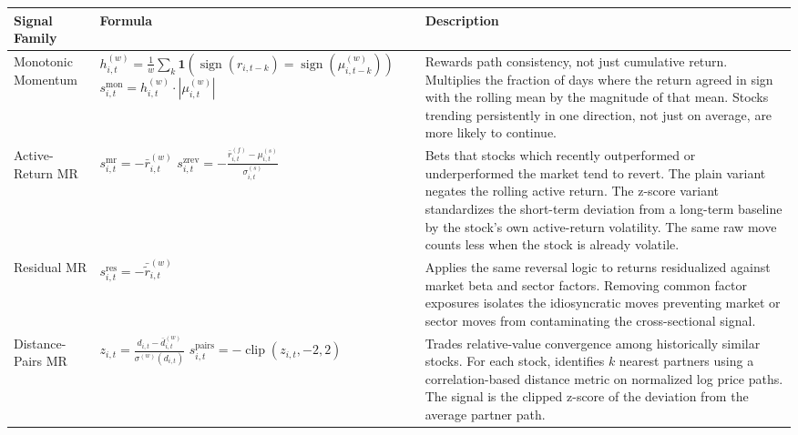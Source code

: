 \documentclass{article}
\begin{document}
\begin{table}[H]
    \centering
    \small
    \begin{tabular}{p{2.8cm} >{\raggedright\arraybackslash}p{4.5cm} >{\raggedright\arraybackslash}p{7cm}}
        \toprule
        Signal Family & Formula & Description \\
        \midrule
        Monotonic Momentum &
        $h^{(w)}_{i,t} = \frac{1}{w}\sum_{k} \mathbf{1}(\operatorname{sign}(r_{i,t-k}) = \operatorname{sign}(\mu^{(w)}_{i,t-k}))$ \newline\newline $s^{\mathrm{mon}}_{i,t} = h^{(w)}_{i,t} \cdot |\mu^{(w)}_{i,t}|$ &
        Rewards path consistency, not just cumulative return. Multiplies the fraction of days where the return agreed in sign with the rolling mean by the magnitude of that mean. Stocks trending persistently in one direction, not just on average, are more likely to continue. \\
        \midrule
        Active-Return MR &
        $s^{\mathrm{mr}}_{i,t} = -\bar{r}^{(w)}_{i,t}$ \newline\newline $s^{\mathrm{zrev}}_{i,t} = -\frac{\bar{r}^{(f)}_{i,t} - \mu^{(s)}_{i,t}}{\sigma^{(s)}_{i,t}}$ &
        Bets that stocks which recently outperformed or underperformed the market tend to revert. The plain variant negates the rolling active return. The z-score variant standardizes the short-term deviation from a long-term baseline by the stock's own active-return volatility. The same raw move counts less when the stock is already volatile. \\
        \midrule
        Residual MR &
        $s^{\mathrm{res}}_{i,t} = -\bar{\tilde{r}}^{(w)}_{i,t}$ &
        Applies the same reversal logic to returns residualized against market beta and sector factors. Removing common factor exposures isolates the idiosyncratic moves preventing market or sector moves from contaminating the cross-sectional signal. \\
        \midrule
        Distance-Pairs MR &
        $z_{i,t} = \frac{d_{i,t} - \bar{d}^{(w)}_{i,t}}{\sigma^{(w)}(d_{i,t})}$ \newline\newline $s^{\text{pairs}}_{i,t} = -\operatorname{clip}(z_{i,t}, -2, 2)$ &
        Trades relative-value convergence among historically similar stocks. For each stock, identifies $k$ nearest partners using a correlation-based distance metric on normalized log price paths. The signal is the clipped z-score of the deviation from the average partner path. \\

\end{tabular}
\end{table}
\end{document}
